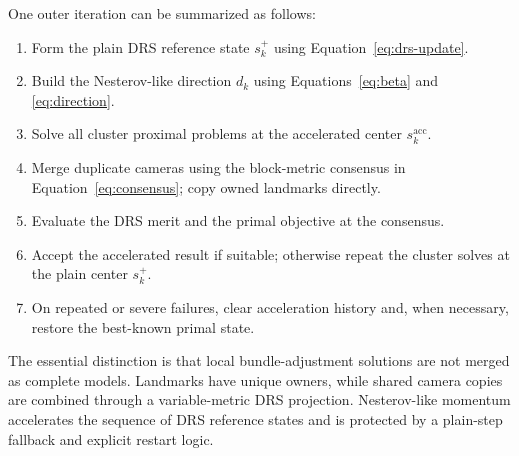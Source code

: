 \documentclass[11pt]{article}
\begin{document}
One outer iteration can be summarized as follows:
\begin{enumerate}
  \item Form the plain DRS reference state $s_k^{+}$ using
        Equation~\eqref{eq:drs-update}.
  \item Build the Nesterov-like direction $d_k$ using
        Equations~\eqref{eq:beta} and \eqref{eq:direction}.
  \item Solve all cluster proximal problems at the accelerated center
        $s_k^{\mathrm{acc}}$.
  \item Merge duplicate cameras using the block-metric consensus in
        Equation~\eqref{eq:consensus}; copy owned landmarks directly.
  \item Evaluate the DRS merit and the primal objective at the consensus.
  \item Accept the accelerated result if suitable; otherwise repeat the
        cluster solves at the plain center $s_k^{+}$.
  \item On repeated or severe failures, clear acceleration history and,
        when necessary, restore the best-known primal state.
\end{enumerate}

The essential distinction is that local bundle-adjustment solutions are not
merged as complete models.  Landmarks have unique owners, while shared camera
copies are combined through a variable-metric DRS projection.  Nesterov-like
momentum accelerates the sequence of DRS reference states and is protected by
a plain-step fallback and explicit restart logic.
\end{document}
